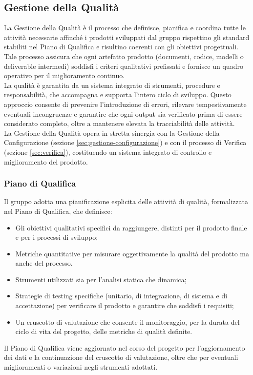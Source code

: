 \subsection{Gestione della Qualità}
\label{sec:gestione-qualita}
La Gestione della Qualità è il processo che definisce, pianifica e coordina tutte le attività necessarie affinché i prodotti sviluppati dal gruppo rispettino gli standard stabiliti nel Piano di Qualifica e risultino coerenti con gli obiettivi progettuali.\\
Tale processo assicura che ogni artefatto prodotto (documenti, codice, modelli o deliverable intermedi) soddisfi i criteri qualitativi prefissati e fornisce un quadro operativo per il miglioramento continuo.\\
La qualità è garantita da un sistema integrato di strumenti, procedure e responsabilità, che accompagna e supporta l'intero ciclo di sviluppo. Questo approccio consente di prevenire l'introduzione di errori, rilevare tempestivamente eventuali incongruenze e garantire che ogni output sia verificato prima di essere considerato completo, oltre a mantenere elevata la tracciabilità delle attività.\\
La Gestione della Qualità opera in stretta sinergia con la Gestione della Configurazione (sezione \ref{sec:gestione-configurazione}) e con il processo di Verifica (sezione \ref{sec:verifica}), costituendo un sistema integrato di controllo e miglioramento del prodotto.

\subsubsection{Piano di Qualifica}
Il gruppo adotta una pianificazione esplicita delle attività di qualità, formalizzata nel Piano di Qualifica, che definisce:
\begin{itemize}[itemsep=3pt, parsep=1pt, label=$\scriptstyle\bullet$]
    \item Gli obiettivi qualitativi specifici da raggiungere, distinti per il prodotto finale e per i processi di sviluppo;
    \item Metriche quantitative per misurare oggettivamente la qualità del prodotto ma anche del processo.
    \item Strumenti utilizzati sia per l'analisi statica che dinamica;
    \item Strategie di testing specifiche (unitario, di integrazione, di sistema e di accettazione) per verificare il prodotto e garantire che soddisfi i requisiti;
    \item Un cruscotto di valutazione che consente il monitoraggio, per la durata del ciclo di vita del progetto, delle metriche di qualità definite.
\end{itemize}
Il Piano di Qualifica viene aggiornato nel corso del progetto per l'aggiornamento dei dati e la continuazione del cruscotto di valutazione, oltre che per eventuali miglioramenti o variazioni negli strumenti adottati.


